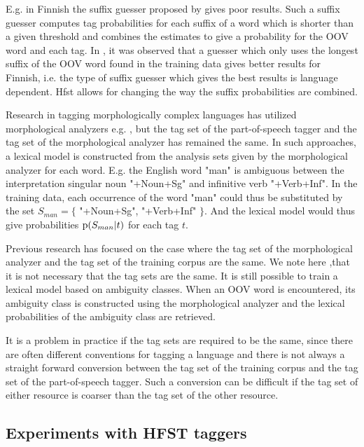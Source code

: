 \documentclass{llncs}
\begin{document}
E.g. in Finnish the suffix guesser proposed by \cite{Brants:2000} gives
poor results. Such a suffix guesser computes tag probabilities for
each suffix of a word which is shorter than a given threshold and
combines the estimates to give a probability for the OOV word and
each tag. In \cite{silfverberg/2011/nodalida}, it was observed that a guesser
which only uses the longest suffix of the OOV word found in the
training data gives better results for Finnish, i.e. the type of suffix
guesser which gives the best results is language dependent. Hfst
allows for changing the way the suffix probabilities are combined.

Research in tagging morphologically complex languages has utilized
morphological analyzers e.g. \cite{Tzoukerman:1996,Oravecz:2002}, but
the tag set of the part-of-speech tagger and the tag set of the
morphological analyzer has remained the same. In such approaches, a
lexical model is constructed from the analysis sets given by the
morphological analyzer for each word. E.g. the English word "man" is
ambiguous between the interpretation singular noun "+Noun+Sg" and
infinitive verb "+Verb+Inf". In the training data, each occurrence of
the word "man" could thus be substituted by the set $S_{man} = \{$
"+Noun+Sg", "+Verb+Inf" $\}$. And the lexical model would thus give
probabilities ${\rm p}(S_{man}|t)$ for each tag $t$. 

Previous research has focused on the case where the tag set of the
morphological analyzer and the tag set of the training corpus are the
same. We note here ,that it is not necessary that the tag sets are
the same. It is still possible to train a lexical model based on
ambiguity classes. When an OOV word is encountered, its ambiguity
class is constructed using the morphological analyzer and the lexical
probabilities of the ambiguity class are retrieved.

It is a problem in practice if the tag sets are required to be the
same, since there are often different conventions for tagging a
language and there is not always a straight forward conversion
between the tag set of the training corpus and the tag set of the
part-of-speech tagger. Such a conversion can be difficult if the tag
set of either resource is coarser than the tag set of the other
resource.

\subsection{Experiments with HFST taggers}
\end{document}
